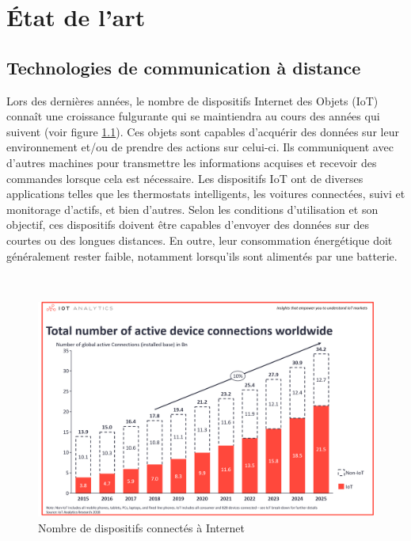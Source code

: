 \chapter{État de l'art}

\section{Technologies de communication à distance}


Lors des dernières années, le nombre de dispositifs Internet des Objets (IoT) connaît une croissance fulgurante qui se maintiendra au cours des années qui suivent (voir figure \ref{fig:iot_number}). Ces objets sont capables d’acquérir des données sur leur environnement et/ou de prendre des actions sur celui-ci. Ils communiquent avec d’autres machines pour transmettre les informations acquises et recevoir des commandes lorsque cela est nécessaire. Les dispositifs IoT ont de diverses applications telles que les thermostats intelligents, les voitures connectées, suivi et monitorage d’actifs, et bien d’autres. Selon les conditions d’utilisation et son objectif, ces dispositifs doivent être capables d’envoyer des données sur des courtes ou des longues distances. En outre, leur consommation énergétique doit généralement rester faible, notamment lorsqu’ils sont alimentés par une batterie.

~

\begin{figure}[ht!]
  \includegraphics[width=\textwidth]{img/state_of_the_art/iot_number_connected.png}
  \caption{Nombre de dispositifs connectés à Internet \cite{lueth_2018}}
  \label{fig:iot_number}
\end{figure}

~

